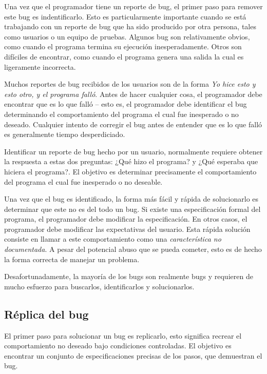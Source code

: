 \documentclass[12pt,legalpaper]{report}
\begin{document}
Una vez que el programador tiene un reporte de bug, el primer paso para remover este bug es indentificarlo.  Esto es particularmente importante cuando se está trabajando con un reporte de bug que ha sido producido por otra persona, tales como usuarios o un equipo de pruebas.  Algunos bug son relativamente obvios, como cuando el programa termina su ejecución inesperadamente. Otros son difíciles de encontrar, como cuando el programa genera una salida la cual es ligeramente incorrecta.

Muchos reportes de bug recibidos de los usuarios son de la forma \textit{Yo hice esto y esto otro, y el programa falló}.  Antes de hacer cualquier cosa, el programador debe encontrar que es lo que falló -- esto es, el programador debe identificar el bug determinando el comportamiento del programa el cual fue inesperado o no deseado.  Cualquier intento de corregir el bug antes de entender que es lo que falló es generalmente tiempo desperdiciado.

Identificar un reporte de bug hecho por un usuario, normalmente requiere obtener la respuesta a estas dos preguntas: ¿Qué hizo el programa? y ¿Qué esperaba que hiciera el programa?.  El objetivo es determinar precisamente el comportamiento del programa el cual fue inesperado o no deseable.

Una vez que el bug es identificado, la forma más fácil y rápida de solucionarlo es determinar que este no es del todo un bug.  Si existe una especificación formal del programa, el programador debe modificar la especificación.  En otros casos, el programador debe modificar las expectativas del usuario.  Esta rápida solución consiste en llamar a este comportamiento como una \textit{característica no documentada}.  A pesar del potencial abuso que se pueda cometer,  esto es de hecho la forma correcta de manejar un problema.

Desafortunadamente, la mayoría de los bugs son realmente bugs y requieren de mucho esfuerzo para buscarlos, identificarlos y solucionarlos.


\subsection{Réplica del bug}

El primer paso para solucionar un bug es replicarlo, esto significa recrear el comportamiento no deseado bajo condiciones controladas.  El objetivo es encontrar un conjunto de especificaciones precisas de los pasos, que demuestran el bug.
\end{document}
